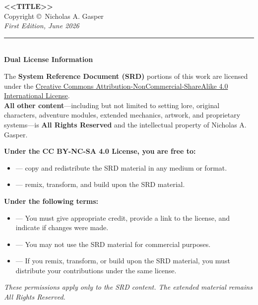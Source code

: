 \cleardoublepage
\thispagestyle{empty}
\begin{center}
  \vspace*{2in}
  {\LARGE\textbf{<<TITLE>>}}\\[0.3in]
  Copyright \copyright\ Nicholas A. Gasper\\[0.2in]
  \textit{First Edition, June 2026}\\[0.2in]

  \rule{0.6\textwidth}{0.4pt}\\[0.3in]

  \textbf{Dual License Information}\\[0.2in]

  \begin{minipage}{0.9\textwidth}
    \small
    The \textbf{System Reference Document (SRD)} portions of this work are licensed under the
    \href{http://creativecommons.org/licenses/by-nc-sa/4.0/}{Creative Commons Attribution-NonCommercial-ShareAlike 4.0 International License}.\\
    \vspace{0.1in}
    \textbf{All other content}---including but not limited to setting lore, original characters,
    adventure modules, extended mechanics, artwork, and proprietary systems---is
    \textbf{All Rights Reserved} and the intellectual property of Nicholas A. Gasper.
  \end{minipage}

  \vspace{0.3in}

  \begin{minipage}{0.9\textwidth}
    \small
    \textbf{Under the CC BY-NC-SA 4.0 License, you are free to:}
    \begin{itemize}
      \item[\textbf{Share}] --- copy and redistribute the SRD material in any medium or format.
      \item[\textbf{Adapt}] --- remix, transform, and build upon the SRD material.
    \end{itemize}
    \textbf{Under the following terms:}
    \begin{itemize}
      \item[\textbf{Attribution}] --- You must give appropriate credit, provide a link to the license,
            and indicate if changes were made.
      \item[\textbf{NonCommercial}] --- You may not use the SRD material for commercial purposes.
      \item[\textbf{ShareAlike}] --- If you remix, transform, or build upon the SRD material,
            you must distribute your contributions under the same license.
    \end{itemize}
    \textit{These permissions apply only to the SRD content. The extended material remains}
    \textit{All Rights Reserved.}
  \end{minipage}


\end{center}
